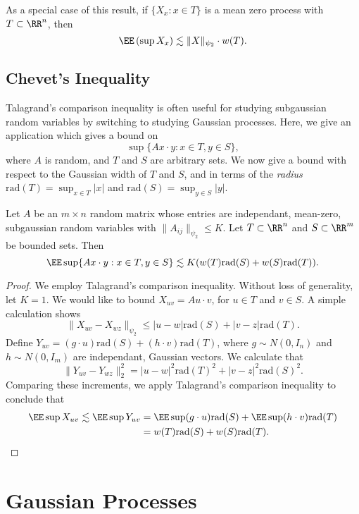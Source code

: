 As a special case of this result, if $\{ X_x : x \in T \}$ is a mean zero process with $T \subset \RR^n$, then
%
\[ \EE \left( \sup X_x \right) \lesssim \| X \|_{\psi_2} \cdot w(T). \]

\section{Chevet's Inequality}

Talagrand's comparison inequality is often useful for studying subgaussian random variables by switching to studying Gaussian processes. Here, we give an application which gives a bound on
%
\[ \sup \{ Ax \cdot y : x \in T, y \in S \}, \]
%
where $A$ is random, and $T$ and $S$ are arbitrary sets. We now give a bound with respect to the Gaussian width of $T$ and $S$, and in terms of the {\it radius} $\text{rad}(T) = \sup_{x \in T} |x|$ and $\text{rad}(S) = \sup_{y \in S} |y|$.

\begin{theorem}
	Let $A$ be an $m \times n$ random matrix whose entries are independant, mean-zero, subgaussian random variables with $\| A_{ij} \|_{\psi_2} \leq K$. Let $T \subset \RR^n$ and $S \subset \RR^m$ be bounded sets. Then
	\[ \EE \sup \{ Ax \cdot y : x \in T, y \in S \} \lesssim K(w(T) \text{rad}(S) + w(S) \text{rad}(T)). \]
\end{theorem}
\begin{proof}
	We employ Talagrand's comparison inequality. Without loss of generality, let $K = 1$. We would like to bound $X_{uv} = Au \cdot v$, for $u \in T$ and $v \in S$. A simple calculation shows
	\[ \| X_{uv} - X_{wz} \|_{\psi_2} \leq |u-w| \text{rad}(S) + |v-z| \text{rad}(T). \]
	Define $Y_{uv} = (g \cdot u) \text{rad}(S) + (h \cdot v) \text{rad}(T)$, where $g \sim N(0,I_n)$ and $h \sim N(0,I_m)$ are independant, Gaussian vectors. We calculate that
	\[ \| Y_{uv} - Y_{wz} \|_2^2 = |u-w|^2 \text{rad}(T)^2 + |v-z|^2 \text{rad}(S)^2. \]
	Comparing these increments, we apply Talagrand's comparison inequality to conclude that
	\begin{align*}
		\EE \sup X_{uv} \lesssim \EE \sup Y_{uv} &= \EE \sup (g \cdot u) \text{rad}(S) + \EE \sup (h \cdot v) \text{rad}(T)\\
		&= w(T) \text{rad}(S) + w(S) \text{rad}(T). \qedhere
	\end{align*}
\end{proof}

\chapter{Gaussian Processes}

